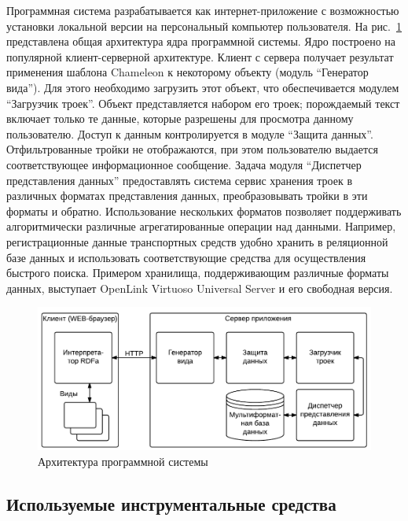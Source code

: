 \documentclass[utf8]{../IncArticle}
\begin{document}
Программная система разрабатывается как интернет-приложение с
возможностью установки локальной версии на персональный компьютер
пользователя.  На рис.~\ref{architecture} представлена общая
архитектура ядра программной системы.  Ядро построено на популярной
клиент-серверной архитектуре.  Клиент с сервера получает результат
применения шаблона Chameleon к некоторому объекту (модуль ``Генератор
вида'').  Для этого необходимо загрузить этот объект, что
обеспечивается модулем ``Загрузчик троек''.  Объект представляется
набором его троек; порождаемый текст включает только те данные,
которые разрешены для просмотра данному пользователю.  Доступ к данным
контролируется в модуле ``Защита данных''.  Отфильтрованные тройки не
отображаются, при этом пользователю выдается соответствующее
информационное сообщение.  Задача модуля ``Диспетчер представления
данных'' предоставлять система сервис хранения троек в различных
форматах представления данных, преобразовывать тройки в эти форматы и
обратно.  Использование нескольких форматов позволяет поддерживать
алгоритмически различные агрегатированные операции над данными.
Например, регистрационные данные транспортных средств удобно хранить в
реляционной базе данных и использовать соответствующие средства для
осуществления быстрого поиска.  Примером хранилища, поддерживающим
различные форматы данных, выступает OpenLink Virtuoso Universal Server
\cite{b2:8} и его свободная версия.

\begin{figure}[!t]
\centering
\includegraphics[width=0.8\linewidth]{peixe-architecture-ru-1.pdf}
\caption{Архитектура программной системы}
\label{architecture}
\end{figure}

\subsection{Используемые инструментальные средства}
\label{sec:instr}
\end{document}
